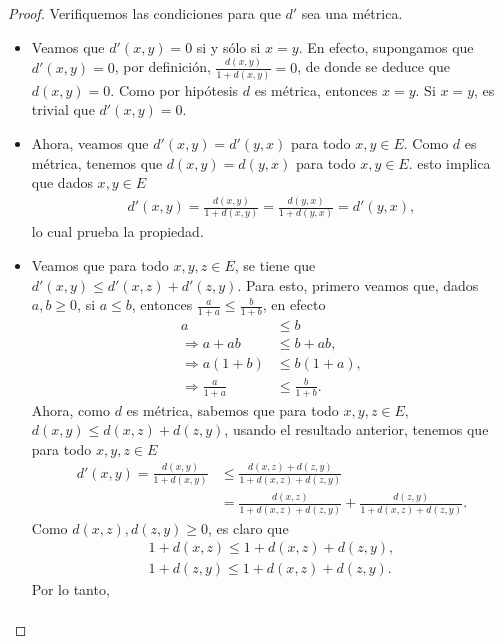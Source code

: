 \begin{itemize}[leftmargin=*]
    \begin{proof}
    Verifiquemos las condiciones para que $d'$ sea una métrica.
        \begin{itemize}
            \item Veamos que $d'(x,y)=0$ si y sólo si $x=y$. En efecto, supongamos que $d'(x,y)=0$, por definición, $\displaystyle \frac{d(x,y)}{1+d(x,y)}=0$, de donde se deduce que $d(x,y)=0$. Como por hipótesis $d$ es métrica, entonces $x=y$. Si $x=y$, es trivial que $d'(x,y)=0$.
            \item Ahora, veamos que $d'(x,y)=d'(y,x)$ para todo $x,y \in E$. Como $d$ es métrica, tenemos que $d(x,y)=d(y,x)$ para todo $x,y \in E$. esto implica que dados $x,y \in E$
            \begin{align*}
                d'(x,y)=\frac{d(x,y)}{1+d(x,y)}=\frac{d(y,x)}{1+d(y,x)}=d'(y,x),
            \end{align*}
            lo cual prueba la propiedad.
            \item Veamos que para todo $x,y,z \in E$, se tiene que $d'(x,y)\leq d'(x,z)+d'(z,y)$. Para esto, primero veamos que, dados $a,b\geq 0$, si $a \leq b$, entonces $\displaystyle \frac{a}{1+a}\leq \frac{b}{1+b}$, en efecto
            \begin{align*}
                a&\leq b\\
                \Rightarrow a + ab &\leq b+ab,\\
                \Rightarrow a(1+b) &\leq b(1+a),\\
                \Rightarrow \frac{a}{1+a}&\leq \frac{b}{1+b}.
            \end{align*}
            Ahora, como $d$ es métrica, sabemos que para todo $x,y,z \in E$, $d(x,y)\leq d(x,z)+d(z,y)$, usando el resultado anterior, tenemos que para todo $x,y,z \in E$
            \begin{align*}
                d'(x,y)=\frac{d(x,y)}{1+d(x,y)}&\leq \frac{d(x,z)+d(z,y)}{1+d(x,z)+d(z,y)}\\
                &=\frac{d(x,z)}{1+d(x,z)+d(z,y)}+\frac{d(z,y)}{1+d(x,z)+d(z,y)}.
            \end{align*}
            Como $d(x,z),d(z,y)\geq 0$, es claro que
            \begin{align*}
                1+d(x,z)\leq 1+d(x,z)+d(z,y),\\
                1+d(z,y) \leq 1+d(x,z)+d(z,y).
            \end{align*}
            Por lo tanto,
            \begin{align*}

\end{align*}
\end{itemize}
\end{proof}
\end{itemize}
